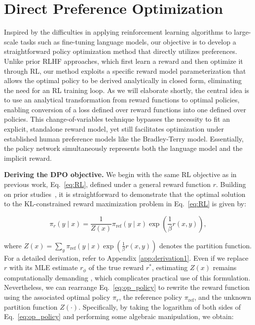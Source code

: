 \section{Direct Preference Optimization}\label{sec:DPO}

Inspired by the difficulties in applying reinforcement learning algorithms to large-scale tasks such as fine-tuning language models, our objective is to develop a straightforward policy optimization method that directly utilizes preferences. Unlike prior RLHF approaches, which first learn a reward and then optimize it through RL, our method exploits a specific reward model parameterization that allows the optimal policy to be derived analytically in closed form, eliminating the need for an RL training loop. As we will elaborate shortly, the central idea is to use an analytical transformation from reward functions to optimal policies, enabling conversion of a loss defined over reward functions into one defined over policies. This change-of-variables technique bypasses the necessity to fit an explicit, standalone reward model, yet still facilitates optimization under established human preference models like the Bradley-Terry model. Essentially, the policy network simultaneously represents both the language model and the implicit reward.

\textbf{Deriving the DPO objective.} We begin with the same RL objective as in previous work, Eq.~\ref{eq:RL}, defined under a general reward function $r$. Building on prior studies~\citep{peters2007reinforcement, peng2019advantage, korbak2022reinforcement, go2023aligning}, it is straightforward to demonstrate that the optimal solution to the KL-constrained reward maximization problem in Eq.~\ref{eq:RL} is given by:

\begin{equation}\label{eq:op_policy}
    \pi_r(y\mid x) = \frac{1}{Z(x)}\pi_\text{ref}(y\mid x)\exp\left(\frac{1}{\beta}r(x, y)\right),
\end{equation}

where $Z(x) =\sum_{y}\pi_\text{ref}(y\mid x)\exp\left(\frac{1}{\beta}r(x, y)\right)$ denotes the partition function. For a detailed derivation, refer to Appendix \ref{app:derivation1}. Even if we replace $r$ with its MLE estimate $r_{\phi}$ of the true reward $r^*$, estimating $Z(x)$ remains computationally demanding \citep{korbak2022reinforcement, go2023aligning}, which complicates practical use of this formulation. Nevertheless, we can rearrange Eq.~\ref{eq:op_policy} to rewrite the reward function using the associated optimal policy $\pi_r$, the reference policy $\pi_\text{ref}$, and the unknown partition function $Z(\cdot)$. Specifically, by taking the logarithm of both sides of Eq.~\ref{eq:op_policy} and performing some algebraic manipulation, we obtain:

